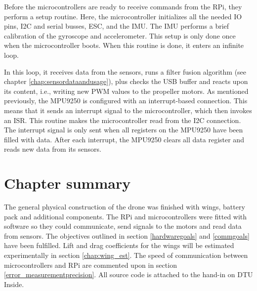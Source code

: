 Before the microcontrollers are ready to receive commands from the RPi, they perform a setup routine. Here, the microcontroller initializes all the needed IO pins, I2C and serial busses, ESC, and the IMU. The IMU performs a brief calibration of the gyroscope and accelerometer. This setup is only done once when the microcontroller boots. When this routine is done, it enters an infinite loop. 

In this loop, it receives data from the sensors, runs a filter fusion algorithm (see chapter \ref{chap:sensordataandusage}), plus checks the USB buffer and reacts upon its content, i.e., writing new PWM values to the propeller motors.
As mentioned previously, the MPU9250 is configured with an interrupt-based connection. 
This means that it sends an interrupt signal to the microcontroller, which then invokes an ISR. This routine makes the microcontroller read from the I2C connection. The interrupt signal is only sent when all registers on the MPU9250 have been filled with data. After each interrupt, the MPU9250 clears all data register and reads new data from its sensors.  

\section{Chapter summary}
The general physical construction of the drone was finished with wings, battery pack and additional components. The RPi and microcontrollers were fitted with software so they could communicate, send signals to the motors and read data from sensors. The objectives outlined in section \ref{hardwaregoals} and \ref{commgoals} have been fulfilled. Lift and drag coefficients for the wings will be estimated experimentally in section \ref{chap:wing_est}. The speed of communication between microcontrollers and RPi are commented upon in section \ref{error_measurementprecision}. All source code is attached to the hand-in on DTU Inside. 

